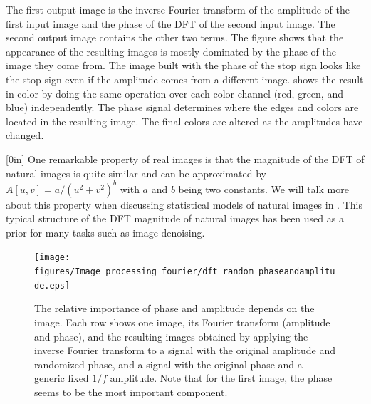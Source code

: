 The first output image is the inverse Fourier transform of the amplitude of the first input image and the phase of the DFT of the second input image. The second output image contains the other two terms. The figure shows that the appearance of the resulting images is mostly dominated by the phase of the image they come from. The image built with the phase of the stop sign looks like the stop sign even if the amplitude comes from a different image. \Fig{\ref{fig:phaseoramp}} shows the result in color by doing the same operation over each color channel (red, green, and blue) independently. The phase signal determines where the edges and colors are located in the resulting image. The final colors are altered as the amplitudes have changed. 


[0in]
One remarkable property of real images is that the magnitude of the DFT of natural images is quite similar and can be approximated by $A \left[u,v \right] = a/ (u^2+v^2)^b$ with $a$ and $b$ being two constants. We will talk more about this property when discussing statistical models of natural images in \chap{\ref{chapter:stat_image_models}}. This typical structure of the DFT magnitude of natural images has been used as a prior for many tasks such as image denoising.


\begin{figure}[t]
\centerline{
\texttt{[image: figures/Image\_processing\_fourier/dft\_random\_phaseandamplitude.eps]}}
\caption{The relative importance of phase and amplitude depends on the image. Each row shows one image, its Fourier transform (amplitude and phase), and the resulting images obtained by applying the inverse Fourier transform to a signal with the original amplitude and randomized phase, and a signal with the original phase and a generic fixed $1/f$ amplitude. Note that for the first image, the phase seems to be the most important component. 
}
\label{fig:phasevsamp}
\end{figure}

